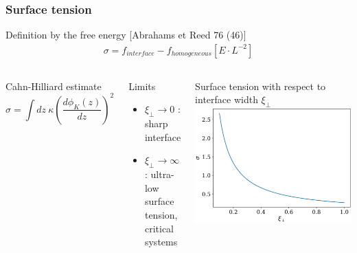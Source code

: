 \documentclass[9pt, dvipsnames]{beamer} %
\begin{document}
\begin{frame}
    \frametitle{Surface tension}
    \begin{block}{Definition by the free energy [Abrahams et Reed 76 (46)]}
        \begin{align}
            \sigma = f_{interface} - f_{homogeneous}  [E \cdot L^{-2}]
        \end{align}
    \end{block}
    \begin{columns}
    \begin{block}{Cahn-Hilliard estimate }
        \begin{equation}
            \sigma= \int dz\ {\kappa}\left(\frac{d\phi_K(z)}{dz}\right)^2 
        \end{equation}    
    \end{block}
    \begin{block}{Limits}
    	\begin{itemize}
			\item $\xi_\perp \to 0$ : sharp interface
			\item $\xi_\perp \to \infty$ : ultra-low surface tension, critical systems 	
    	\end{itemize}
    \end{block}
    \begin{block}{    Surface tension with respect to interface width $\xi_\perp$}
    \includegraphics[width=\linewidth]{tension-superficielle.pdf} \\    
    \end{block}
    \end{columns}
\end{frame}
\end{document}
